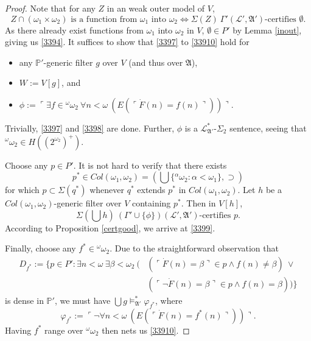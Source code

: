 \documentclass[12pt, twoside]{memoir}
\numberwithin{equation}{section}
\theoremstyle{definition}
\theoremstyle{remark}
\theoremstyle{definition}
\theoremstyle{definition}
\theoremstyle{definition}
\theoremstyle{remark}
\begin{document}
\begin{proof}
Note that for any $Z$ in an weak outer model of $V$, 
\begin{equation*}
    Z \cap (\omega_1 \times \omega_2) \text{ is a function from } \omega_1 \text{ into } \omega_2 \iff \Sigma(Z) \ \Gamma'(\mathcal{L}', \mathfrak{A}') \text{-certifies } \emptyset \text{.}
\end{equation*}
As there already exist functions from $\omega_1$ into $\omega_2$ in $V$, $\emptyset \in P'$ by Lemma \ref{inout}, giving us \ref{3394}. It suffices to show that \ref{3397} to \ref{33910} hold for
\begin{itemize}
    \item any $\mathbb{P}'$-generic filter $g$ over $V$ (and thus over $\mathfrak{A}$),
    \item $W := V[g]$, and
    \item $\phi := \ulcorner \exists f \in {^{\omega}{\omega_2}} \ \forall n < \omega \ (E(\ulcorner \dot{F}(n) = f(n) \urcorner)) \urcorner$.
\end{itemize}
Trivially, \ref{3397} and \ref{3398} are done. Further, $\phi$ is a $\mathcal{L}^{*}_{\mathfrak{A}'}$-$\Sigma_2$ sentence, seeing that ${^{\omega}{\omega_2}} \in H((2^{\omega_2})^+)$.

Choose any $p \in P'$. It is not hard to verify that there exists 
\begin{equation*}
    p^* \in Col(\omega_1, \omega_2) = (\bigcup \{{^{\alpha}{\omega_2}} : \alpha < \omega_1\}, \supset)
\end{equation*} 
for which $p \subset \Sigma(q^*)$ whenever $q^*$ extends $p^*$ in $Col(\omega_1, \omega_2)$. Let $h$ be a $Col(\omega_1, \omega_2)$-generic filter over $V$ containing $p^*$. Then in $V[h]$, 
\begin{equation*}
    \Sigma(\bigcup h) \ (\Gamma' \cup \{\phi\})(\mathcal{L}', \mathfrak{A}') \text{-certifies } p \text{.}
\end{equation*}
According to Proposition \ref{certgood}, we arrive at \ref{3399}.

Finally, choose any $f^* \in {^{\omega}{\omega_2}}$. Due to the straightforward observation that 
\begin{align*}
    D_{f^*} := \{p \in P' : \exists n < \omega \ \exists \beta < \omega_2 \ ( & (\ulcorner \dot{F}(n) = \beta \urcorner \in p \wedge f(n) \neq \beta) \ \vee \\
    & (\ulcorner \neg \dot{F}(n) = \beta \urcorner \in p \wedge f(n) = \beta))\}
\end{align*}
is dense in $\mathbb{P}'$, we must have $\bigcup g \models^{*}_{\mathfrak{A}'} \varphi_{f^*}$, where
\begin{equation*}
    \varphi_{f^*} := \ulcorner \neg \forall n < \omega \ (E(\ulcorner \dot{F}(n) = f^*(n) \urcorner)) \urcorner \text{.}
\end{equation*}
Having $f^*$ range over ${^{\omega}{\omega_2}}$ then nets us \ref{33910}.
\end{proof}
\end{document}

